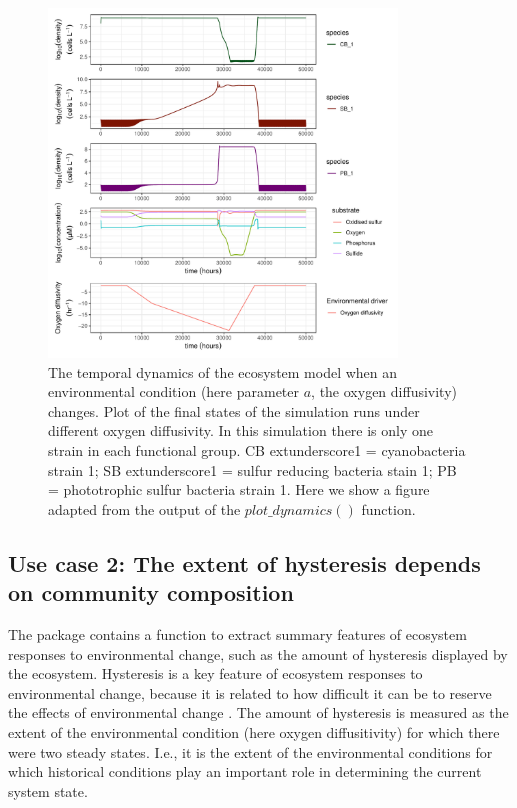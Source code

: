 \documentclass[]{elsarticle} %
\begin{document}
\begin{figure}

{\centering \includegraphics[width=350px]{figures/gen_uc1_partrep_temporal_state_switching} 

}

\caption{The temporal dynamics of the ecosystem model when an environmental condition (here parameter $a$, the oxygen diffusivity) changes. Plot of the final states of the simulation runs under different oxygen diffusivity. In this simulation there is only one strain in each functional group. CB    extunderscore1 = cyanobacteria strain 1; SB extunderscore1 = sulfur reducing bacteria stain 1; PB = phototrophic sulfur bacteria strain 1. Here we show a figure adapted from the output of the $plot\_dynamics()$  function.}\label{fig:uc1}
\end{figure}

\hypertarget{use-case-2-the-extent-of-hysteresis-depends-on-community-composition}{%
\subsection{Use case 2: The extent of hysteresis depends on community composition}\label{use-case-2-the-extent-of-hysteresis-depends-on-community-composition}}

The package contains a function to extract summary features of ecosystem responses to environmental change, such as the amount of hysteresis displayed by the ecosystem. Hysteresis is a key feature of ecosystem responses to environmental change, because it is related to how difficult it can be to reserve the effects of environmental change \citep{Scheffer2001}. The amount of hysteresis is measured as the extent of the environmental condition (here oxygen diffusitivity) for which there were two steady states. I.e., it is the extent of the environmental conditions for which historical conditions play an important role in determining the current system state.
\end{document}
